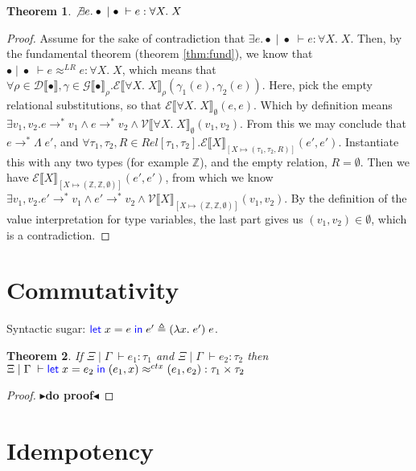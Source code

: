 \documentclass[twoside,11pt,openright]{report}
\newtheorem{theorem}{Theorem}
\theoremstyle{definition}
\newcommand{\var}{x}
\newcommand{\expr}{e}
\newcommand{\val}{v}
\newcommand{\Tvar}{X}
\newcommand{\Tlam}{\Lambda\;}
\newcommand{\Tint}{\mathbb{Z}}
\newcommand{\Tprod}[2]{#1 \times #2}
\newcommand{\Tall}[2]{\forall #1.\; #2}
\newcommand{\typ}{\tau}
\newcommand{\venv}{\Gamma}
\newcommand{\tenv}{\Xi}
\newcommand{\emptenv}{\bullet}
\newcommand{\empvenv}{\bullet}
\newcommand{\jdg}[4]{#1 \; | \; #2 \; \vdash #3 : #4}
\newcommand{\jdgRel}[6]{#1 \; | \; #2 \; \vdash #3 \approx^{#4} #5 : #6}
\newcommand{\ctxRel}[5]{\jdgRel{#1}{#2}{#3}{ctx}{#4}{#5}}
\newcommand{\stepS}{\rightarrow^*}
\newcommand{\ValInp}[2]{\mathcal{V} \llbracket #1 \rrbracket_{#2}}
\newcommand{\ValInpGen}[2]{\ValInp{#1}{#2}(\val_1, \val_2)}
\newcommand{\ExpInp}[2]{\mathcal{E} \llbracket #1 \rrbracket_{#2}}
\newcommand{\VenvInp}[2]{\mathcal{G} \llbracket #1 \rrbracket_{#2}}
\newcommand{\TenvInp}[1]{\mathcal{D} \llbracket #1 \rrbracket}
\newcommand{\LogRel}[5]{\jdgRel{#1}{#2}{#3}{LR}{#4}{#5}}
\newcommand{\map}[2]{#1 \mapsto #2}
\newcommand{\todo}[1]{{\color[rgb]{.5,0,0}\textbf{$\blacktriangleright$#1$\blacktriangleleft$}}}
\begin{document}
\begin{theorem}
  $\not\exists \expr . \jdg{\emptenv}{\empvenv}{\expr}{\Tall{\Tvar}{\Tvar}}$
\end{theorem}
\begin{proof}
  Assume for the sake of contradiction that $\exists \expr . \jdg{\emptenv}{\empvenv}{\expr}{\Tall{\Tvar}{\Tvar}}$. Then, by the fundamental theorem (theorem \ref{thm:fund}), we know that $\LogRel{\emptenv}{\empvenv}{\expr}{\expr}{\Tall{\Tvar}{\Tvar}}$, which means that $\forall \rho \in \TenvInp{\emptenv}, \gamma \in \VenvInp{\empvenv}{\rho} . 
  \ExpInp{\Tall{\Tvar}{\Tvar}}{\rho}(\gamma_1(\expr), \gamma_2(\expr))$. Here, pick the empty relational substitutions, so that $\ExpInp{\Tall{\Tvar}{\Tvar}}{\emptyset}(\expr, \expr)$. Which by definition means $\exists \val_1, \val_2 . \expr \stepS \val_1 \land \expr \stepS \val_2 \land \ValInpGen{\Tall{\Tvar}{\Tvar}}{\emptyset}$. From this we may conclude that $\expr \stepS \Tlam \expr'$, and $\forall \typ_1, \typ_2, R \in Rel[\typ_1, \typ_2] . \ExpInp{\Tvar}{[\map{\Tvar}{(\typ_1, \typ_2, R)}]}(\expr', \expr')$. Instantiate this with any two types (for example $\Tint$), and the empty relation, $R = \emptyset$. Then we have $\ExpInp{\Tvar}{[\map{\Tvar}{(\Tint, \Tint, \emptyset)}]}(\expr', \expr')$, from which we know $\exists \val_1, \val_2 . \expr' \stepS \val_1 \land \expr' \stepS \val_2 \land \ValInpGen{\Tvar}{[\map{\Tvar}{(\Tint, \Tint, \emptyset)}]}$. By the definition of the value interpretation for type variables, the last part gives us $(\val_1, \val_2) \in \emptyset$, which is a contradiction.
\end{proof}

\section{Commutativity}

Syntactic sugar:
$\Let \var = \expr in \expr' \triangleq (\fun \var . \expr') \; \expr$.

\begin{theorem}
  If $\jdg{\tenv}{\venv}{\expr_1}{\typ_1}$ and $\jdg{\tenv}{\venv}{\expr_2}{\typ_2}$ then\\
  $\ctxRel{\tenv}{\venv}{\Let \var = \expr_2 in (\expr_1, \var)}{(\expr_1, \expr_2)}{\Tprod{\typ_1}{\typ_2}}$
\end{theorem}
\begin{proof}
  \todo{do proof}
\end{proof}


\section{Idempotency}
\end{document}

